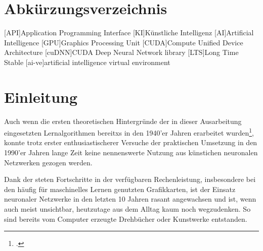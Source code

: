 \documentclass[12pt, oneside]{article}
\begin{document}
\tableofcontents



\newpage

\listoffigures
{}


\newpage

%
\listoftables


\newpage

\section*{Abkürzungsverzeichnis}
%


\begin{acronym}[ECU]
[API]{Application Programming Interface}
[KI]{Künstliche Intelligenz}
[AI]{Artificial Intelligence}
[GPU]{Graphics Processing Unit}
[CUDA]{Compute Unified Device Architecture}
[cuDNN]{CUDA Deep Neural Network library}
[LTS]{Long Time Stable}
[ai-ve]{artificial intelligence virtual environment}
\end{acronym}



\newpage
{}
\setcounter{page}{1}
  
  


\section{Einleitung} \label{einleitung}

Auch wenn die ersten theoretischen Hintergründe der in dieser Ausarbeitung eingesetzten Lernalgorithmen bereitxs in den 1940'er Jahren erarbeitet wurden\footcite{history}, konnte trotz erster enthusiastischerer Versuche der praktischen Umsetzung in den 1990'er Jahren lange Zeit keine nennenswerte Nutzung aus künstichen neuronalen Netzwerken gezogen werden.

Dank der steten Fortschritte in der verfügbaren Rechenleistung, insbesondere bei den häufig für maschinelles Lernen genutzten Grafikkarten, ist der Einsatz neuronaler Netzwerke in den letzten 10 Jahren rasant angewachsen und ist, wenn auch meist unsichtbar, heutzutage aus dem Alltag kaum noch wegzudenken. So sind bereits vom Computer erzeugte Drehbücher oder Kunstwerke entstanden.\\
\end{document}

